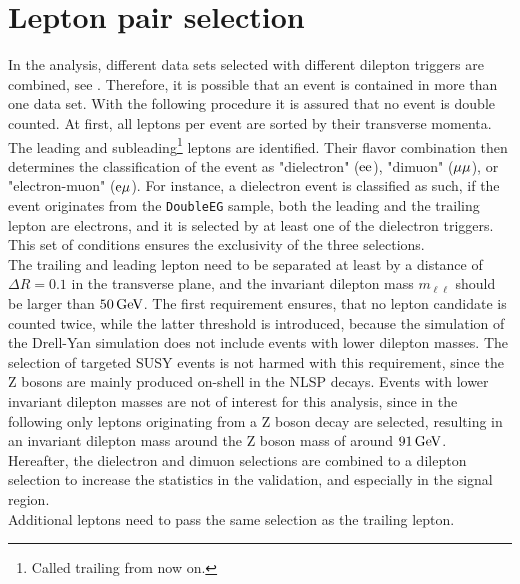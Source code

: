 \section{Lepton pair selection}\label{sec:lepPair}
In the analysis, different data sets selected with different dilepton triggers are combined, see . Therefore, it is possible that an event is contained in more than one data set. With the following procedure it is assured that no event is double counted. At first, all leptons per event are sorted by their transverse momenta. The leading and subleading\footnote{Called trailing from now on.} leptons are identified. Their flavor combination then determines the classification of the event as "dielectron" ($\mathrm{e}\mathrm{e}$), "dimuon" (${\mu}{\mu}$), or "electron-muon" ($\mathrm{e}{\mu}$). For instance, a dielectron event is classified as such, if the event originates from the \texttt{DoubleEG} sample, both the leading and the trailing lepton are electrons, and it is selected by at least one of the dielectron triggers. This set of conditions ensures the exclusivity of the three selections.\\
The trailing and leading lepton need to be separated at least by a distance of $\Delta R=0.1$ in the transverse plane, and the invariant dilepton mass $m_{\ell\ell}$ should be larger than $50\,\text{Ge\hspace{-.08em}V}$. The first requirement ensures, that no lepton candidate is counted twice, while the latter threshold is introduced, because the simulation of the Drell-Yan simulation does not include events with lower dilepton masses. The selection of targeted SUSY events is not harmed with this requirement, since the Z bosons are mainly produced on-shell in the NLSP decays. Events with lower invariant dilepton masses are not of interest for this analysis, since in the following only leptons originating from a Z boson decay are selected, resulting in an invariant dilepton mass around the Z boson mass of around $91\,\text{Ge\hspace{-.08em}V}$.\\
Hereafter, the dielectron and dimuon selections are combined to a dilepton selection to increase the statistics in the validation, and especially in the signal region.\\
Additional leptons need to pass the same selection as the trailing lepton.



